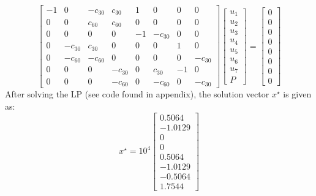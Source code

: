 \documentclass[12pt]{article}
\begin{document}
\begin{equation}
\left[
\begin{array}{cccccccc}
-1  & 0             & -c_{30}  &  c_{30}   &1     &0            &0   &0\\
0   & 0             &c_{60}     &c_{60}     &0     &0            &0   &0\\
0   &0              &0              &0              &-1    &-c_{30}  &0   &0\\
0   &-c_{30}   &c_{30}     &0              &0     &0             &1   &0\\
0   &-c_{60}   &-c_{60}    &0              &0    &0              &0   &-c_{30} \\
0   & 0             &0              &-c_{30}    &0    &c_{30}    &-1  &0\\
0   &0              &0              &-c_{60}    &0    &-c_{60}   &0   &-c_{30} 
\end{array}
\right]
\left[
\begin{array}{c}
u_1\\
u_2\\
u_3\\
u_4\\
u_5\\
u_6\\
u_7\\
P
\end{array}
\right]
=
\left[
\begin{array}{c}
0\\
0\\
0\\
0\\
0\\
0\\
0\\
0
\end{array}
\right]
\end{equation}
After solving the LP (see code found in appendix), the solution vector $x^\star$ is given as:
\begin{equation}
\nonumber
x^\star = 10^4
\left[
\begin{array}{r}
0.5064\\
-1.0129\\
0\\
0\\
0.5064\\
-1.0129\\
-0.5064\\
1.7544
\end{array}
\right]
\end{equation}
\end{document}
